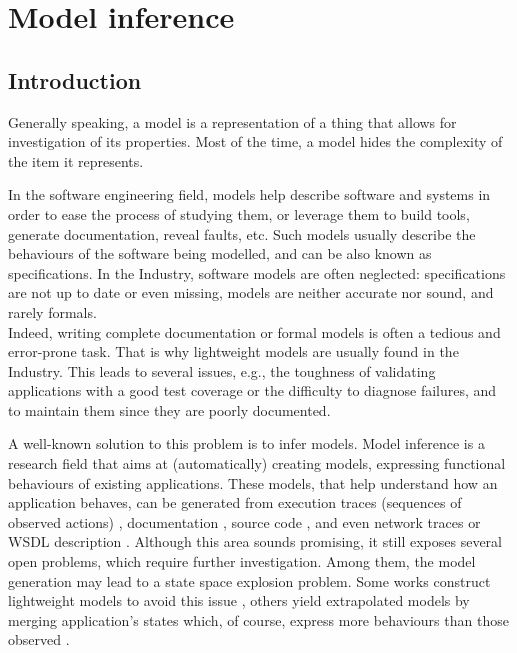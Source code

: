 \section{Model inference}
\label{sec:related:modelinf}

\subsection{Introduction}
\label{sec:related:modelinf:intro}

Generally speaking, a model is a representation of a thing that
allows for investigation of its properties. Most of the time, a
model hides the complexity of the item it represents.

In the software engineering field, models help describe software
and systems in order to ease the process of studying them, or
leverage them to build tools, generate documentation, reveal
faults, etc. Such models usually describe the behaviours of the
software being modelled, and can be also known as specifications.
In the Industry, software models are often neglected:
specifications are not up to date or even missing, models are
neither accurate nor sound, and rarely formals.\\
Indeed, writing complete documentation or formal models is often
a tedious and error-prone task. That is why lightweight models
are usually found in the Industry. This leads to several issues,
e.g., the toughness of validating applications with a good test
coverage or the difficulty to diagnose failures, and to maintain
them since they are poorly documented.

A well-known solution to this problem is to infer models. Model
inference is a research field that aims at (automatically)
creating models, expressing functional behaviours of existing
applications.  These models, that help understand how an
application behaves, can be generated from execution traces
(sequences of observed actions)
\cite{Krka:2010:UDE:1810295.1810324}, documentation
\cite{ZhongZXM11}, source code
\cite{Salah05scenariographer,Pradel:2009}, and even network
traces \cite{6079839} or WSDL description
\cite{Bertolino:2009:ASB:1595696.1595719}. Although this area
sounds promising, it still exposes several open problems, which
require further investigation. Among them, the model generation
may lead to a state space explosion problem. Some works construct
lightweight models to avoid this issue \cite{WPX13}, others yield
extrapolated models by merging application's states which, of
course, express more behaviours than those observed
\cite{4023976}.


